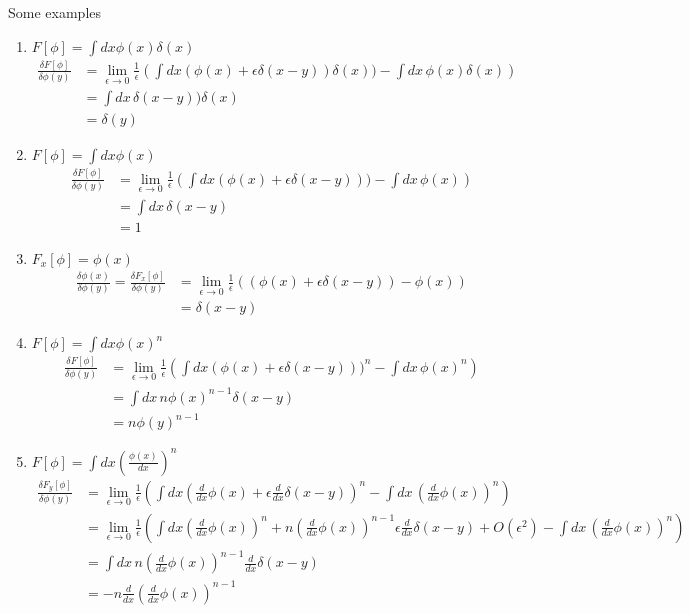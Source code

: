\documentclass[../main.tex]{subfiles}
\begin{document}
Some examples
\begin{enumerate}
    \item $F[\phi]=\int dx \phi(x)\delta(x)$
    \begin{align}
        \frac{\delta F[\phi]}{\delta\phi(y)}
           &=\lim_{\epsilon\rightarrow0}\frac{1}{\epsilon}\left(\int dx(\phi(x)+\epsilon\delta(x-y))\delta(x))-\int
        dx\,\phi(x)\delta(x)\right)\\
        &=\int dx\,\delta(x-y))\delta(x)\\
       &=\delta(y)
    \end{align}
    \item $F[\phi]=\int dx \phi(x)$
    \begin{align}
        \frac{\delta F[\phi]}{\delta\phi(y)}
        &=\lim_{\epsilon\rightarrow0}\frac{1}{\epsilon}\left(\int dx(\phi(x)+\epsilon\delta(x-y)))-\int dx\,\phi(x)\right)\\
        &=\int dx\,\delta(x-y)\\
        &=1
    \end{align}
    \item $F_x[\phi]=\phi(x)$
    \begin{align}
        \frac{\delta \phi(x)}{\delta\phi(y)}=\frac{\delta F_x[\phi]}{\delta\phi(y)}
        &=\lim_{\epsilon\rightarrow0}\frac{1}{\epsilon}\left((\phi(x)+\epsilon\delta(x-y))-\phi(x)\right)\\
        &=\delta(x-y)
    \end{align}
    \item $F[\phi]=\int dx \phi(x)^n$
    \begin{align}
        \frac{\delta F[\phi]}{\delta\phi(y)}
        &=\lim_{\epsilon\rightarrow0}\frac{1}{\epsilon}\left(\int dx(\phi(x)+\epsilon\delta(x-y)))^n-\int dx\,\phi(x)^n\right)\\
        &=\int dx\,n\phi(x)^{n-1}\delta(x-y)\\
        &=n\phi(y)^{n-1}
    \end{align}
    \item $F[\phi]=\int dx \left(\frac{\phi(x)}{dx}\right)^n$
	\begin{align}
	\frac{\delta F_y[\phi]}{\delta\phi(y)}
	&=\lim_{\epsilon\rightarrow0}\frac{1}{\epsilon}\left(\int dx(\frac{d}{dx}\phi(x)+\epsilon\frac{d}{dx}\delta(x-y))^n-\int dx\,(\frac{d}{dx}\phi(x))^n\right)\\
	&=\lim_{\epsilon\rightarrow0}\frac{1}{\epsilon}\left(\int dx(\frac{d}{dx}\phi(x))^n+n(\frac{d}{dx}\phi(x))^{n-1}\epsilon\frac{d}{dx}\delta(x-y)+O(\epsilon^2)-\int dx\,(\frac{d}{dx}\phi(x))^n\right)\\
	&=\int dx\, n(\frac{d}{dx}\phi(x))^{n-1}\frac{d}{dx}\delta(x-y)\\
	&=- n\frac{d}{dx}(\frac{d}{dx}\phi(x))^{n-1}
	\end{align}	    
    

\end{enumerate}
\end{document}
